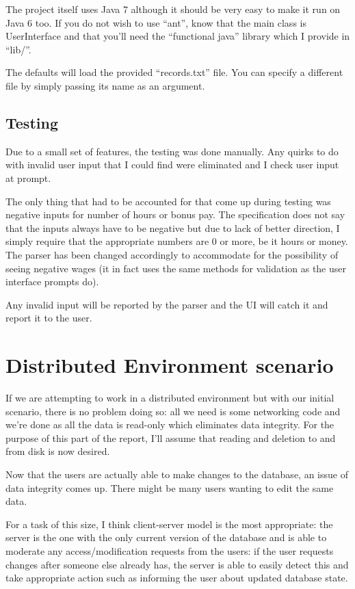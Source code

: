 \documentclass{report}
\begin{document}
The project itself uses Java 7 although it should be very easy to make
it run on Java 6 too. If you do not wish to use ``ant'', know that the
main class is UserInterface and that you'll need the ``functional
java'' library which I provide in ``lib/''.

The defaults will load the provided ``records.txt'' file. You can
specify a different file by simply passing its name as an argument.

\subsection*{Testing}
Due to a small set of features, the testing was done manually. Any
quirks to do with invalid user input that I could find were eliminated
and I check user input at prompt.

The only thing that had to be accounted for that come up during
testing was negative inputs for number of hours or bonus pay. The
specification does not say that the inputs always have to be negative
but due to lack of better direction, I simply require that the
appropriate numbers are 0 or more, be it hours or money. The parser
has been changed accordingly to accommodate for the possibility of
seeing negative wages (it in fact uses the same methods for
validation as the user interface prompts do).

Any invalid input will be reported by the parser and the UI will catch
it and report it to the user.


\section*{Distributed Environment scenario}
If we are attempting to work in a distributed environment but with our
initial scenario, there is no problem doing so: all we need is some
networking code and we're done as all the data is read-only which
eliminates data integrity. For the purpose of this part of the report,
I'll assume that reading and deletion to and from disk is now desired.

Now that the users are actually able to make changes to the database,
an issue of data integrity comes up. There might be many users wanting
to edit the same data.

For a task of this size, I think client-server model is the most
appropriate: the server is the one with the only current version of
the database and is able to moderate any access/modification requests
from the users: if the user requests changes after someone else
already has, the server is able to easily detect this and take
appropriate action such as informing the user about updated database
state.
\end{document}
